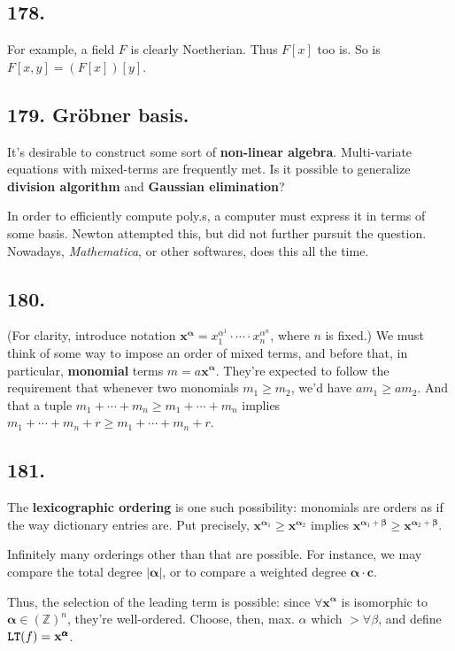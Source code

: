 \documentclass[12pt]{article}
\newcommand\aG\alpha \newcommand\bG\beta  \newcommand\gG\gamma \newcommand\dG\delta \newcommand\eG\varepsilon \newcommand\zG\zeta \newcommand\tG\vartheta \newcommand\kG\kappa \newcommand\lG\lambda \newcommand\sG\sigma \newcommand\fG\varphi \newcommand\oG\omega
\newcommand\M\cdot%
\newcommand\V\mathbf%
\newcommand\Ev\forall%
\newcommand{\BF}[1]{ \mathbb{#1} }%
\newcommand{\Ss}[1]{\textsf{\bfseries{#1}}}%
\newcommand{\Tw}[1]{\texttt{\bfseries{#1}}}%
\begin{document}
\subsection*{178.} For example, a field \(F\) is clearly Noetherian. 
Thus \(F[x]\) too is. So is \(F[x,y] = (F[x])[y]\). 

\subsection*{179. Gr\"obner basis.} It's desirable to construct some sort of \Ss{non-linear algebra}. 
Multi-variate equations with mixed-terms are frequently met. Is it possible to generalize \Ss{division algorithm} and \Ss{Gaussian elimination}? \par
In order to efficiently compute poly.s, a computer must express it in terms of some basis. 
Newton attempted this, but did not further pursuit the question. 
Nowadays, \textit{Mathematica}, or other softwares, does this all the time. 

\subsection*{180.} (For clarity, introduce notation \(\V{x}^{\pmb{\aG}} =x_1^{\aG^1} \M\dotsb\M x_n^{\aG^n}\), where \(n\) is fixed.) 
We must think of some way to impose an order of mixed terms, and before that, in particular, \Ss{monomial} terms \(m= a \V{x}^{\pmb{\aG}}\). 
They're expected to follow the requirement that whenever two monomials \(m_1 \geq m_2\), we'd have \(am_1 \geq am_2\). 
And that a tuple \(m_1+\dotsb+m_n \geq m_1+\dotsb+m_n\) implies \(m_1+\dotsb+m_n +r \geq m_1+\dotsb+m_n +r\). 

\subsection*{181.} The \Ss{lexicographic ordering} is one such possibility: monomials are orders as if the way dictionary entries are. 
Put precisely, \(\V{x}^{\pmb{\aG}_1} \geq \V{x}^{\pmb{\aG}_2}\) implies \(\V{x}^{\pmb{\aG}_1 +\pmb{\bG}} \geq \V{x}^{\pmb{\aG}_2 +\pmb{\bG}}\). \par
Infinitely many orderings other than that are possible. 
For instance, we may compare the total degree \(|\pmb{\aG}|\), 
or to compare a weighted degree \(\pmb{\aG} \M \V{c}\). \par
Thus, the selection of the leading term is possible: since \(\Ev \V{x}^{\pmb{\aG}}\) is isomorphic to \(\pmb{\aG} \in (\BF{Z})^n\), they're well-ordered. 
Choose, then, max. \(\aG\) which \(> \Ev \bG\), and define \(\Tw{LT}(f) =\V{x}^{\pmb{\aG}}\). 
\end{document}
